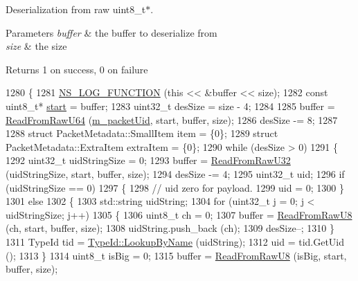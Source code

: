 Deserialization from raw uint8\+\_\+t$\ast$. 


\begin{DoxyParams}{Parameters}
{\em buffer} & the buffer to deserialize from \\
\hline
{\em size} & the size \\
\hline
\end{DoxyParams}
\begin{DoxyReturn}{Returns}
1 on success, 0 on failure 
\end{DoxyReturn}

\begin{DoxyCode}
1280 \{
1281   \hyperlink{log-macros-disabled_8h_a90b90d5bad1f39cb1b64923ea94c0761}{NS\_LOG\_FUNCTION} (\textcolor{keyword}{this} << &buffer << size);
1282   \textcolor{keyword}{const} uint8\_t* \hyperlink{namespacevisualizer_1_1core_a2a35e5d8a34af358b508dac8635754e0}{start} = buffer;
1283   uint32\_t desSize = size - 4;
1284 
1285   buffer = \hyperlink{classns3_1_1PacketMetadata_a069d077359e7d6dac6b575b12584a7ae}{ReadFromRawU64} (\hyperlink{classns3_1_1PacketMetadata_ad97fbc08482c155bc4c11fdff820be86}{m\_packetUid}, start, buffer, size);
1286   desSize -= 8;
1287 
1288   \textcolor{keyword}{struct }PacketMetadata::SmallItem item = \{0\};
1289   \textcolor{keyword}{struct }PacketMetadata::ExtraItem extraItem = \{0\};
1290   \textcolor{keywordflow}{while} (desSize > 0)
1291     \{
1292       uint32\_t uidStringSize = 0;
1293       buffer = \hyperlink{classns3_1_1PacketMetadata_a5a055957d2f52aeee983871a358215a7}{ReadFromRawU32} (uidStringSize, start, buffer, size);
1294       desSize -= 4;
1295       uint32\_t uid;
1296       \textcolor{keywordflow}{if} (uidStringSize == 0)
1297         \{
1298           \textcolor{comment}{// uid zero for payload.}
1299           uid = 0;
1300         \}
1301       \textcolor{keywordflow}{else}
1302         \{
1303           std::string uidString;
1304           \textcolor{keywordflow}{for} (uint32\_t j = 0; j < uidStringSize; j++)
1305             \{
1306               uint8\_t ch = 0;
1307               buffer = \hyperlink{classns3_1_1PacketMetadata_aeab158c490a41b3776aab0b26092ff50}{ReadFromRawU8} (ch, start, buffer, size);
1308               uidString.push\_back (ch);
1309               desSize--;
1310             \}
1311           TypeId tid = \hyperlink{classns3_1_1TypeId_a119cf99c20931fdc294602cd360b180e}{TypeId::LookupByName} (uidString);
1312           uid = tid.GetUid ();
1313         \}
1314       uint8\_t isBig = 0;
1315       buffer = \hyperlink{classns3_1_1PacketMetadata_aeab158c490a41b3776aab0b26092ff50}{ReadFromRawU8} (isBig, start, buffer, size);

\end{DoxyCode}
